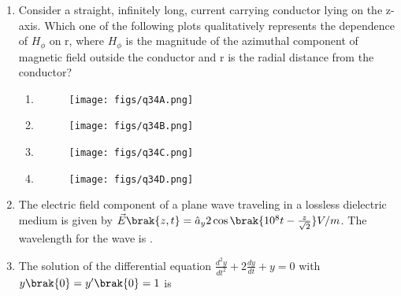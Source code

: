 \documentclass[a4paper, 11pt]{article}
\begin{document}
\begin{enumerate}
    \hfill{}

    \item Consider a straight, infinitely long, current carrying conductor lying on the z-axis. Which one of the following plots  qualitatively represents the dependence of $H_{\phi}$ on r, where $H_{\phi}$ is the magnitude of the azimuthal component of magnetic field outside the conductor and r is the radial distance from the conductor?
    \begin{enumerate}
        \item \begin{figure}[H]\centering\texttt{[image: figs/q34A.png]}\end{figure}
        \item \begin{figure}[H]\centering\texttt{[image: figs/q34B.png]}\end{figure}
        \item \begin{figure}[H]\centering\texttt{[image: figs/q34C.png]}\end{figure}
        \item \begin{figure}[H]\centering\texttt{[image: figs/q34D.png]}\end{figure}
    \end{enumerate}
    
    \hfill{}

    \item The electric field component of a plane wave traveling in a lossless dielectric medium is given by $\vec{E}\brak{z,t}=\hat{a}_{y}2 \cos\brak{10^{8}t-\frac{z}{\sqrt{2}}}V/m$. The wavelength  for the wave is \underline{\hspace{2cm}}.
    
    \hfill{}

    \item The solution of the differential equation $\frac{d^{2}y}{dt^{2}}+2\frac{dy}{dt}+y=0$ with $y\brak{0}=y'\brak{0}=1$ is
    \begin{enumerate}
    \end{enumerate}
    

\end{enumerate}
\end{document}
